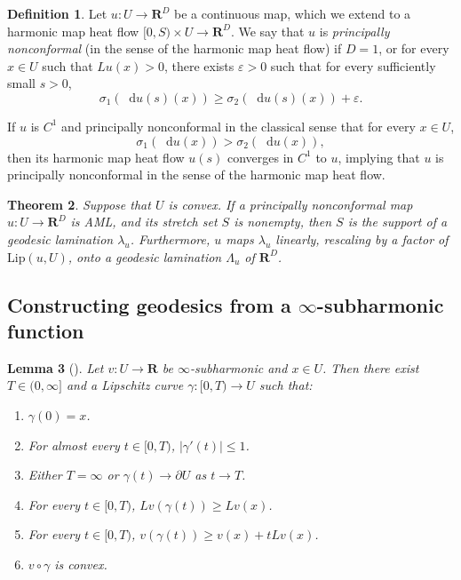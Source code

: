 \documentclass[reqno,11pt]{amsart}
\newcommand{\RR}{\mathbf{R}}
\newcommand*\dif{\mathop{}\!\mathrm{d}}
\newcommand{\Lip}{\mathrm{Lip}}
\newcommand{\dfn}[1]{\emph{#1}\index{#1}}
\newtheorem{theorem}{Theorem}[section]
\newtheorem{lemma}[theorem]{Lemma}
\theoremstyle{definition}
\newtheorem{definition}[theorem]{Definition}
\numberwithin{equation}{section}
\begin{document}
\begin{definition}
Let $u: U \to \RR^D$ be a continuous map, which we extend to a harmonic map heat flow $[0, S) \times U \to \RR^D$.
We say that $u$ is \dfn{principally nonconformal} (in the sense of the harmonic map heat flow) if $D = 1$, or for every $x \in U$ such that $Lu(x) > 0$, there exists $\varepsilon > 0$ such that for every sufficiently small $s > 0$, 
$$\sigma_1(\dif u(s)(x)) \geq \sigma_2(\dif u(s)(x)) + \varepsilon.$$
\end{definition}

If $u$ is $C^1$ and principally nonconformal in the classical sense that for every $x \in U$,
$$\sigma_1(\dif u(x)) > \sigma_2(\dif u(x)),$$
then its harmonic map heat flow $u(s)$ converges in $C^1$ to $u$, implying that $u$ is principally nonconformal in the sense of the harmonic map heat flow.

\begin{theorem}
Suppose that $U$ is convex.
If a principally nonconformal map $u: U \to \RR^D$ is AML, and its stretch set $S$ is nonempty, then $S$ is the support of a geodesic lamination $\lambda_u$.
Furthermore, $u$ maps $\lambda_u$ linearly, rescaling by a factor of $\Lip(u, U)$, onto a geodesic lamination $\Lambda_u$ of $\RR^D$.
\end{theorem}

\subsection{Constructing geodesics from a \texorpdfstring{$\infty$-subharmonic}{infinity-subharmonic} function}
\begin{lemma}[{\cite[Proposition 6.2]{Crandall2008}}]\label{infinity subharmonic gradient flow}
Let $v: U \to \RR$ be $\infty$-subharmonic and $x \in U$.
Then there exist $T \in (0, \infty]$ and a Lipschitz curve $\gamma: [0, T) \to U$ such that:
\begin{enumerate}
\item $\gamma(0) = x$.
\item For almost every $t \in [0, T)$, $|\gamma'(t)| \leq 1$.
\item Either $T = \infty$ or $\gamma(t) \to \partial U$ as $t \to T$.
\item For every $t \in [0, T)$, $Lv(\gamma(t)) \geq Lv(x)$.
\item For every $t \in [0, T)$, $v(\gamma(t)) \geq v(x) + tLv(x)$.
\item $v \circ \gamma$ is convex.
\end{enumerate}
\end{lemma}
\end{document}
